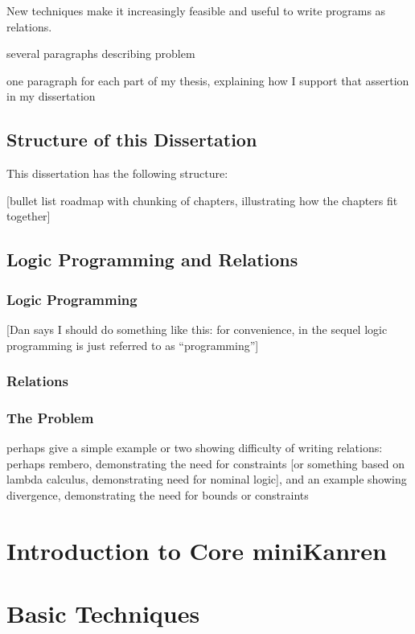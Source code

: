   New techniques make it increasingly feasible and useful to write
  programs as relations.

  several paragraphs describing problem

  one paragraph for each part of my thesis, explaining how I support
  that assertion in my dissertation
  
  \section{Structure of this Dissertation}

This dissertation has the following structure:

[bullet list roadmap with chunking of chapters, illustrating how the
chapters fit together]

  \section{Logic Programming and Relations}

    \subsection{Logic Programming}

    [Dan says I should do something like this: for convenience, in the
    sequel logic programming is just referred to as ``programming'']

    \subsection{Relations}

    \subsection{The Problem}

    perhaps give a simple example or two showing difficulty of writing
    relations: perhaps rembero, demonstrating the need for constraints
    [or something based on lambda calculus, demonstrating need for
    nominal logic], and an example showing divergence, demonstrating
    the need for bounds or constraints

\chapter{Introduction to Core miniKanren}

\chapter{Basic Techniques}

